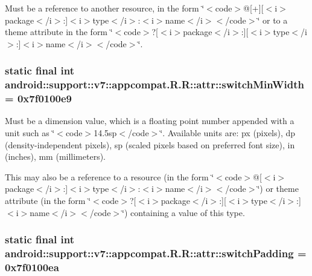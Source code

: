 Must be a reference to another resource, in the form \char`\"{}$<$code$>$@\mbox{[}+\mbox{]}\mbox{[}$<$i$>$package$<$/i$>$:\mbox{]}$<$i$>$type$<$/i$>$:$<$i$>$name$<$/i$>$$<$/code$>$\char`\"{} or to a theme attribute in the form \char`\"{}$<$code$>$?\mbox{[}$<$i$>$package$<$/i$>$:\mbox{]}\mbox{[}$<$i$>$type$<$/i$>$:\mbox{]}$<$i$>$name$<$/i$>$$<$/code$>$\char`\"{}. \hypertarget{classandroid_1_1support_1_1v7_1_1appcompat_1_1_r_1_1attr_2bccda1a3a53f6525ebc02488f61d536}{
\subsubsection[{switchMinWidth}]{\setlength{\rightskip}{0pt plus 5cm}static final int android::support::v7::appcompat.R.R::attr::switchMinWidth = 0x7f0100e9}}
\label{classandroid_1_1support_1_1v7_1_1appcompat_1_1_r_1_1attr_2bccda1a3a53f6525ebc02488f61d536}


Must be a dimension value, which is a floating point number appended with a unit such as \char`\"{}$<$code$>$14.5sp$<$/code$>$\char`\"{}. Available units are: px (pixels), dp (density-independent pixels), sp (scaled pixels based on preferred font size), in (inches), mm (millimeters). 

This may also be a reference to a resource (in the form \char`\"{}$<$code$>$@\mbox{[}$<$i$>$package$<$/i$>$:\mbox{]}$<$i$>$type$<$/i$>$:$<$i$>$name$<$/i$>$$<$/code$>$\char`\"{}) or theme attribute (in the form \char`\"{}$<$code$>$?\mbox{[}$<$i$>$package$<$/i$>$:\mbox{]}\mbox{[}$<$i$>$type$<$/i$>$:\mbox{]}$<$i$>$name$<$/i$>$$<$/code$>$\char`\"{}) containing a value of this type. \hypertarget{classandroid_1_1support_1_1v7_1_1appcompat_1_1_r_1_1attr_8772eabebe00ab97e2b738e60f5d2388}{
\subsubsection[{switchPadding}]{\setlength{\rightskip}{0pt plus 5cm}static final int android::support::v7::appcompat.R.R::attr::switchPadding = 0x7f0100ea}}
\label{classandroid_1_1support_1_1v7_1_1appcompat_1_1_r_1_1attr_8772eabebe00ab97e2b738e60f5d2388}


